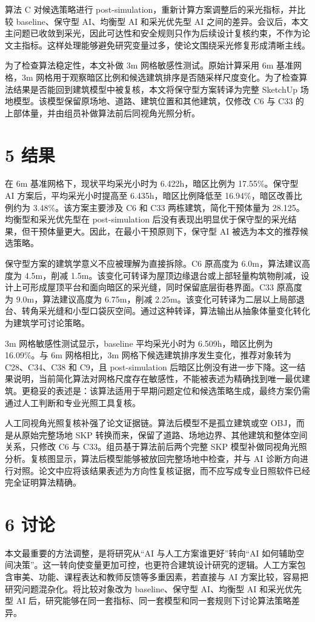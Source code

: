 \documentclass[UTF8,zihao=-4,a4paper]{ctexart}
\begin{document}
算法 C 对候选策略进行 post-simulation，重新计算方案调整后的采光指标，并比较 baseline、保守型 AI、均衡型 AI 和采光优先型 AI 之间的差异。会议后，本文主问题已收敛到采光，因此可达性和安全规则只作为后续设计复核约束，不作为论文主指标。这样处理能够避免研究变量过多，使论文围绕采光修复形成清晰主线。

为了检查算法稳定性，本文补做 3m 网格敏感性测试。原始计算采用 6m 基准网格，3m 网格用于观察暗区比例和候选建筑排序是否随采样尺度变化。为了检查算法结果是否能回到建筑模型中被复核，本文将保守型方案转译为完整 SketchUp 场地模型。该模型保留原场地、道路、建筑位置和其他建筑，仅修改 C6 与 C33 的上部体量，并由组员补做算法前后同视角光照分析。

\section{5 结果}
在 6m 基准网格下，现状平均采光小时为 6.422h，暗区比例为 17.55\%。保守型 AI 方案后，平均采光小时提高至 6.435h，暗区比例降低至 16.94\%，暗区改善比例约为 3.48\%。该方案主要涉及 C6 和 C33 两栋建筑，简化干预体量为 28.125。均衡型和采光优先型在 post-simulation 后没有表现出明显优于保守型的采光结果，但干预体量更大。因此，在最小干预原则下，保守型 AI 被选为本文的推荐候选策略。

保守型方案的建筑学意义不应被理解为直接拆除。C6 原高度为 6.0m，算法建议高度为 4.5m，削减 1.5m。该变化可转译为屋顶边缘退台或上部轻量构筑物削减，设计上可形成屋顶平台和面向暗区的采光缝，同时保留底层街巷界面。C33 原高度为 9.0m，算法建议高度为 6.75m，削减 2.25m。该变化可转译为二层以上局部退台、转角采光缝和小型口袋灰空间。通过这种转译，算法输出从抽象体量变化转化为建筑学可讨论策略。

3m 网格敏感性测试显示，baseline 平均采光小时为 6.509h，暗区比例为 16.09\%。与 6m 网格相比，3m 网格下候选建筑排序发生变化，推荐对象转为 C28、C34、C38 和 C9，且 post-simulation 后暗区比例没有进一步下降。这一结果说明，当前简化算法对网格尺度存在敏感性，不能被表述为精确找到唯一最优建筑。更稳妥的表述是：该算法适用于早期问题定位和候选策略生成，最终方案仍需通过人工判断和专业光照工具复核。

人工同视角光照复核补强了论文证据链。算法后模型不是孤立建筑或空 OBJ，而是从原始完整场地 SKP 转换而来，保留了道路、场地边界、其他建筑和整体空间关系，只修改 C6 与 C33。组员基于算法前后两个完整 SKP 模型补做同视角光照分析。复核图显示，算法后模型能够被放回完整场地中检查，并与 AI 诊断方向进行对照。论文中应将该结果表述为方向性复核证据，而不应写成专业日照软件已经完全证明算法精确。

\section{6 讨论}
本文最重要的方法调整，是将研究从“AI 与人工方案谁更好”转向“AI 如何辅助空间决策”。这一转向使变量更加可控，也更符合建筑设计研究的逻辑。人工方案包含审美、功能、课程表达和教师反馈等多重因素，若直接与 AI 方案比较，容易把研究问题混杂化。将比较对象改为 baseline、保守型 AI、均衡型 AI 和采光优先型 AI 后，研究能够在同一套指标、同一套模型和同一套规则下讨论算法策略差异。
\end{document}
